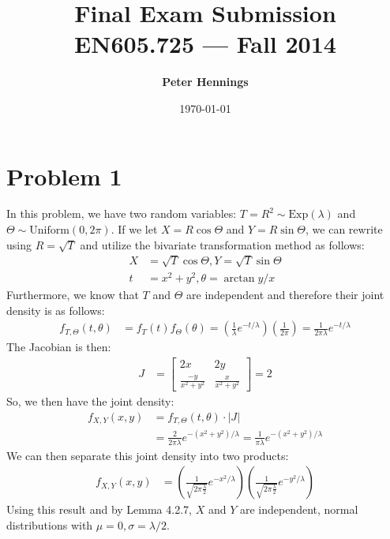 \documentclass[11pt]{article}
\title{\bf Final Exam Submission\\[2ex] 
       \rm\normalsize EN605.725 --- Fall 2014}
\date{\today}
\author{\bf Peter Hennings}
\begin{document}

\maketitle

\newpage

\section*{Problem 1} 

In this problem, we have two random variables:
$T = R^2 \sim \mathrm{Exp}(\lambda)$ and $\Theta \sim
\mathrm{Uniform}(0,2 \pi)$.  If we let $X = R \cos{\Theta}$ and $Y = R
\sin{\Theta}$, we can rewrite using $R = \sqrt{T}$ and utilize the
bivariate transformation method as follows:
\begin{align*}
  X &= \sqrt{T} \cos{\Theta}, Y = \sqrt{T} \sin{\Theta} \\
  t &= x^2 + y^2, \theta = \arctan{y/x}
\end{align*}
Furthermore, we know that $T$ and $\Theta$ are independent and
therefore their joint density is as follows:
\begin{align*}
  f_{T,\Theta}(t,\theta) &= f_T(t) f_{\Theta}(\theta) = \left(
                           \frac{1}{\lambda} e^{-t/\lambda}  \right)
                           \left( \frac{1}{2 \pi} \right) = \frac{1}{2
                           \pi \lambda} e^{-t/\lambda}
\end{align*}
The Jacobian is then:
\begin{align*}
  J &= \begin{bmatrix} 2x & 2y \\ \frac{-y}{x^2+y^2} &
    \frac{x}{x^2+y^2} \end{bmatrix} = 2
\end{align*}
So, we then have the joint density:
\begin{align*}
  f_{X,Y}(x,y) &= f_{T,\Theta}(t,\theta) \cdot \left| J \right| \\
  &= \frac{2}{2 \pi \lambda} e^{-(x^2+y^2)/\lambda} = \frac{1}{\pi \lambda} e^{-(x^2+y^2)/\lambda}
\end{align*}
We can then separate this joint density into two products:
\begin{align*}
  f_{X,Y}(x,y) &= \left( \frac{1}{\sqrt{2 \pi \frac{\lambda}{2}}} e^{-x^2/\lambda}
                 \right) \left( \frac{1}{\sqrt{2 \pi \frac{\lambda}{2}}} e^{-y^2/\lambda} \right)
\end{align*}
Using this result and by Lemma 4.2.7, $X$ and $Y$ are independent, normal
distributions with $\mu = 0, \sigma = \lambda/2$.
\end{document}
